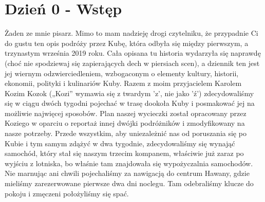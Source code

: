 \chapter[Wstęp]{Dzień 0 - Wstęp}
Żaden ze mnie pisarz.
Mimo to mam nadzieję drogi czytelniku, że przypadnie Ci do gustu ten opis podróży przez Kubę, która odbyła się między pierwszym, a trzynastym września 2019 roku.
Cała opisana tu historia wydarzyła się naprawdę (choć nie spodziewaj się zapierających dech w piersiach scen), a dziennik ten jest jej wiernym odzwierciedleniem, wzbogaconym o elementy kultury, historii, ekonomii, polityki i kulinariów Kuby.
Razem z moim przyjacielem Karolem Kozim Kozok („Kozi” wymawia się z twardym ’z’, nie jako ’ź’) zdecydowaliśmy się w ciągu dwóch tygodni pojechać w trasę dookoła Kuby i posmakować jej na możliwie najwięcej sposobów.
Plan naszej wycieczki został opracowany przez Koziego w oparciu o reportaż innej dwójki podróżników i zmodyfikowany na nasze potrzeby.
Przede wszystkim, aby uniezależnić nas od poruszania się po Kubie i tym samym zdążyć w dwa tygodnie, zdecydowaliśmy się wynająć samochód, który stał się naszym trzecim kompanem, właściwie już zaraz po wyjściu z lotniska, bo właśnie tam znajdowała się wypożyczalnia samochodów.
Nie marnując ani chwili pojechaliśmy za nawigacją do centrum Hawany, gdzie mieliśmy zarezerwowane pierwsze dwa dni noclegu.
Tam odebraliśmy klucze do pokoju i zmęczeni położyliśmy się spać.